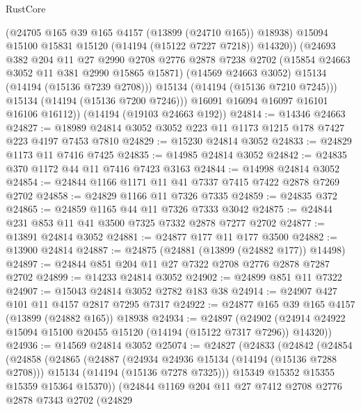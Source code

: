 \begin{lexlean}{RustCore}
\begin{coremodule}
                (@24705 @165 @39 @165 @4157 (@13899 (@24710 @165)) @18938)
                @15094
                @15100
                @15831
                @15120
                (@14194 (@15122 @7227 @7218))
                @14320))
            (@24693
              @382
              @204
              @11
              @27
              @2990
              @2708
              @2776
              @2878
              @7238
              @2702
              (@15854 @24663 @3052 @11 @381 @2990 @15865 @15871)
              (@14569 @24663 @3052)
              @15134
              (@14194 (@15136 @7239 @2708)))
            @15134
            (@14194 (@15136 @7210 @7245)))
          @15134
          (@14194 (@15136 @7200 @7246)))
        @16091
        @16094
        @16097
        @16101
        @16106
        @16112))
    (@14194 (@19103 @24663 @192))
@24814 := @14346 @24663
@24827 := @18989 @24814 @3052 @3052 @223 @11 @1173 @1215 @178 @7427 @223 @4197 @7453 @7810
@24829 := @15230 @24814 @3052
@24833 := @24829 @1173 @11 @7416 @7425
@24835 := @14985 @24814 @3052
@24842 := @24835 @370 @1172 @44 @11 @7416 @7423 @3163
@24844 := @14998 @24814 @3052
@24854 := @24844 @1166 @1171 @11 @41 @7337 @7415 @7422 @2878 @7269 @2702
@24858 := @24829 @1166 @11 @7326 @7335
@24859 := @24835 @372
@24865 := @24859 @1165 @44 @11 @7326 @7333 @3042
@24875 := @24844 @231 @853 @11 @41 @3500 @7325 @7332 @2878 @7277 @2702
@24877 := @13891 @24814 @3052
@24881 := @24877 @177 @11 @177 @3500
@24882 := @13900 @24814
@24887 := @24875 (@24881 (@13899 (@24882 @177)) @14498)
@24897 := @24844 @851 @204 @11 @27 @7322 @2708 @2776 @2878 @7287 @2702
@24899 := @14233 @24814 @3052
@24902 := @24899 @851 @11 @7322
@24907 := @15043 @24814 @3052 @2782 @183 @38
@24914 := @24907 @427 @101 @11 @4157 @2817 @7295 @7317
@24922 := @24877 @165 @39 @165 @4157 (@13899 (@24882 @165)) @18938
@24934 := @24897
    (@24902 (@24914 @24922 @15094 @15100 @20455 @15120 (@14194 (@15122 @7317 @7296)) @14320))
@24936 := @14569 @24814 @3052
@25074 := @24827
    (@24833
      (@24842
        (@24854
          (@24858
            (@24865
              (@24887
                (@24934 @24936 @15134 (@14194 (@15136 @7288 @2708)))
                @15134
                (@14194 (@15136 @7278 @7325)))
              @15349
              @15352
              @15355
              @15359
              @15364
              @15370))
          (@24844
            @1169
            @204
            @11
            @27
            @7412
            @2708
            @2776
            @2878
            @7343
            @2702
            (@24829

\end{coremodule}
\end{lexlean}
